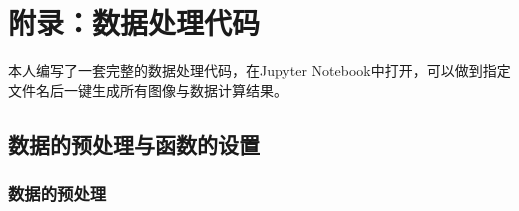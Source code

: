 \section{附录：数据处理代码}

本人编写了一套完整的数据处理代码，在Jupyter Notebook中打开，可以做到指定文件名后一键生成所有图像与数据计算结果。

\subsection{数据的预处理与函数的设置}

\subsubsection{数据的预处理}\label{cap:1-1}

